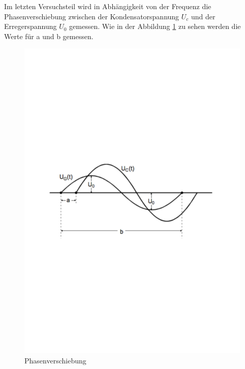 Im letzten Versuchsteil wird in Abhängigkeit von der Frequenz \nu die Phasenverschiebung \varphi zwischen der Kondensatorspannung $U_c$ und der Erregerspannung $U_{0}$ gemessen.
Wie in der Abbildung \ref{phasenverschiebung} zu sehen werden die Werte für a und b gemessen.
\begin{figure}[h!]
  \centering
  \includegraphics[width=\textwidth]{phasenverschiebung.pdf}
  \caption{Phasenverschiebung \cite{2}}
  \label{phasenverschiebung}
\end{figure}
